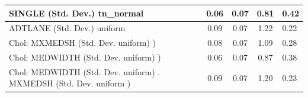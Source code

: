 \begin{table}
\begin{center}
\begin{tabular}{|l|l|c|c|c|l|}
			\hline
			SINGLE (Std. Dev.) tn_normal &  & 0.06 & 0.07 & 0.81 & 0.42 \\
			\hline
			ADTLANE (Std. Dev.) uniform &  & 0.09 & 0.07 & 1.22 & 0.22 \\
			\hline
			 Chol: MXMEDSH (Std. Dev. uniform) ) &  & 0.08 & 0.07 & 1.09 & 0.28 \\
			\hline
			 Chol: MEDWIDTH (Std. Dev. uniform) ) &  & 0.06 & 0.07 & 0.87 & 0.38 \\
			\hline
			 Chol: MEDWIDTH (Std. Dev. uniform) . MXMEDSH (Std. Dev.   uniform ) &  & 0.09 & 0.07 & 1.20 & 0.23 \\
			\hline
		\end{tabular}
	\end{center}
\end{table}